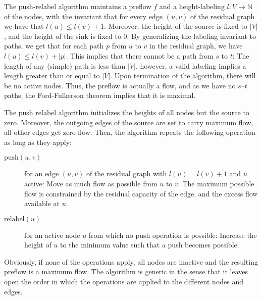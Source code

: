\documentclass[smallcondensed]{svjour3}     %
\begin{document}
  The push-relabel algorithm maintains a preflow $f$ and a height-labeling $l: V \to \mathbb {N}$ of the nodes, 
  with the invariant that for every edge $(u, v)$ of the residual graph we have that $l(u) \le l(v) + 1$. 
  Moreover, the height of the source is fixed to $\left\vert{V}\right\vert$, and the height of the sink is fixed to $0$.
  By generalizing the labeling invariant to paths, we get that for each path $p$ from $u$ to $v$ in the residual graph, we have $l(u) \le l(v) + |p|$.
  This implies that there cannot be a path from $s$ to $t$: The length of any (simple) path is less than $|V|$, however, a valid labeling 
  implies a length greater than or equal to $|V|$. Upon termination of the algorithm, there will be no active nodes. 
  Thus, the preflow is actually a flow, and as we have no $s$--$t$ paths, the Ford-Fulkerson theorem implies that it is maximal.
  
  The push relabel algorithm initializes the heights of all nodes but the source to zero. Moreover, the outgoing edges of the source are 
  set to carry maximum flow, all other edges get zero flow. Then, the algorithm repeats the following operation as long as they apply:
  \begin{description}
    \item[$\textrm{push}(u,v)$] for an edge $(u,v)$ of the residual graph with $l(u) = l(v)+1$ and $u$ active: Move as much flow as possible from $u$ to $v$.
    The maximum possible flow is constrained by the residual capacity of the edge, and the excess flow available at $u$.
    \item[$\textrm{relabel}(u)$] for an active node $u$ from which no push operation is possible: Increase the height of $u$ to the minimum value such that a push
      becomes possible.
  \end{description}
  Obviously, if none of the operations apply, all nodes are inactive and the resulting preflow is a maximum flow.
  The algorithm is generic in the sense that it leaves open the order in which the operations are applied to the different nodes and edges.
  
\end{document}
